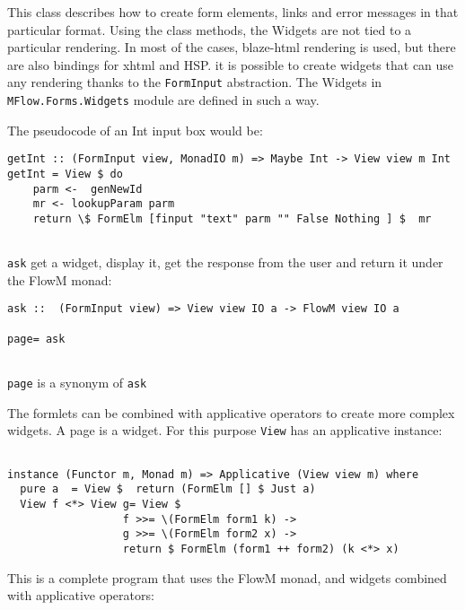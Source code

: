 \documentclass{tmr}
\begin{document}
This class describes how to create form elements, links and error 
messages in that particular format. Using the class methods, the 
Widgets are not tied to a particular rendering. In most of the cases, blaze-html rendering is used, but there are also bindings for xhtml and HSP. it is possible to create widgets that can use any rendering thanks to the {\tt FormInput} abstraction. The Widgets in {\tt MFlow.Forms.Widgets} module are defined in such a way. 
 
The pseudocode of an Int input box would be: 
 
{\tt 
 
\begin{verbatim} 
getInt :: (FormInput view, MonadIO m) => Maybe Int -> View view m Int 
getInt = View $ do 
    parm <-  genNewId 
    mr <- lookupParam parm 
    return \$ FormElm [finput "text" parm "" False Nothing ] $  mr 
 
\end{verbatim} 
 
} 
 
{\tt ask} get a  widget, display it, get the response from the user and return it under the FlowM monad: 
 
{\tt 
 
\begin{verbatim} 
ask ::  (FormInput view) => View view IO a -> FlowM view IO a 
 
page= ask 
 
\end{verbatim} 
 
} 
{\tt page} is a synonym of {\tt ask} 
 
The formlets can be combined with applicative operators to create more complex widgets. A page is a widget. For this purpose {\tt View} has an applicative instance: 
 
{\tt 
 
\begin{verbatim} 
 
instance (Functor m, Monad m) => Applicative (View view m) where 
  pure a  = View $  return (FormElm [] $ Just a) 
  View f <*> View g= View $ 
                  f >>= \(FormElm form1 k) -> 
                  g >>= \(FormElm form2 x) -> 
                  return $ FormElm (form1 ++ form2) (k <*> x)
\end{verbatim} 
 
} 
 
This is a complete program that uses the FlowM monad, and widgets 
combined with applicative operators: 
 
\end{document}
